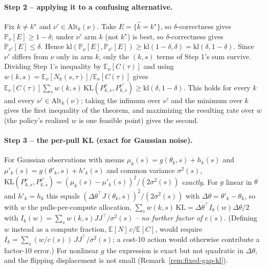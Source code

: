 \paragraph{Step 2 -- applying it to a confusing alternative.}
Fix $k \ne k^\star$ and $\nu' \in \mathrm{Alt}_k(\nu)$. Take $E = \{\hat{k} = k^\star\}$, so
$\delta$-correctness gives $\mathbb{P}_\nu[E] \ge 1-\delta$; under $\nu'$ arm $k$ (not
$k^\star$) is best, so $\delta$-correctness gives $\mathbb{P}_{\nu'}[E] \le \delta$. Hence
$\mathrm{kl}(\mathbb{P}_\nu[E], \mathbb{P}_{\nu'}[E]) \ge \mathrm{kl}(1-\delta, \delta) =
\mathrm{kl}(\delta, 1-\delta)$. Since $\nu'$ differs from $\nu$ only in arm $k$, only the
$(k, s)$ terms of Step 1's sum survive. Dividing Step 1's inequality by
$\mathbb{E}_\nu[C(\tau)]$ and using $w(k,s) = \mathbb{E}_\nu[N_k(s,\tau)] /
\mathbb{E}_\nu[C(\tau)]$ gives
$\mathbb{E}_\nu[C(\tau)] \sum_s w(k,s)\,\mathrm{KL}(P^\nu_{k,s}, P^{\nu'}_{k,s})
\ge \mathrm{kl}(\delta,1-\delta)$. This holds for every $k$ and every $\nu' \in
\mathrm{Alt}_k(\nu)$; taking the infimum over $\nu'$ and the minimum over $k$ gives the
first inequality of the theorem, and maximizing the resulting rate over $w$ (the policy's
realized $w$ is one feasible point) gives the second.

\paragraph{Step 3 -- the per-pull KL (exact for Gaussian noise).}
For Gaussian observations with means $\mu_k(s) = g(\theta_k,s) + h_k(s)$ and
$\mu'_k(s) = g(\theta'_k,s) + h'_k(s)$ and common variance $\sigma^2(s)$,
$\mathrm{KL}(P^\nu_{k,s}, P^{\nu'}_{k,s}) = (\mu_k(s) - \mu'_k(s))^2 / (2\sigma^2(s))$
\emph{exactly}. For $g$ linear in $\theta$ and $h'_k = h_k$ this equals
$(\Delta\theta^\top J(\theta_k,s))^2 / (2\sigma^2(s))$ with $\Delta\theta = \theta'_k -
\theta_k$, so with $w$ the pulls-per-compute allocation,
$\sum_s w(k,s)\,\mathrm{KL} = \Delta\theta^\top I_k(w) \Delta\theta / 2$ with
$I_k(w) = \sum_s w(k,s) J J^\top / \sigma^2(s)$ -- \emph{no further factor of $c(s)$}.
(Defining $w$ instead as a compute fraction, $\mathbb{E}[N]\,c/\mathbb{E}[C]$, would require
$I_k = \sum_s (w/c(s))\, J J^\top/\sigma^2(s)$; a cost-10 action would otherwise contribute
a factor-$10$ error.) For nonlinear $g$ the expression is exact but not quadratic in
$\Delta\theta$, and the flipping displacement is not small (Remark~\ref{rem:fixed-gap-kl}).

